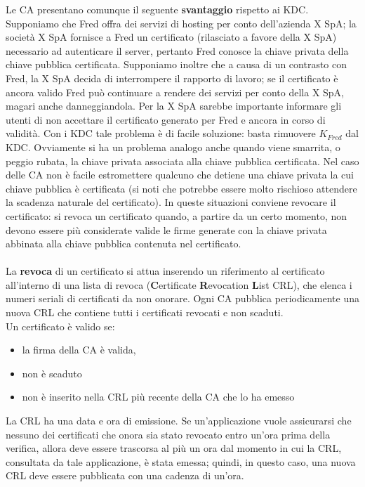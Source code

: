 Le CA presentano comunque il seguente \textbf{svantaggio} rispetto ai KDC. Supponiamo che Fred offra dei servizi di hosting per conto dell'azienda X SpA; la società X SpA fornisce a Fred un certificato (rilasciato a favore della X SpA) necessario ad autenticare il server, pertanto Fred conosce la chiave privata della chiave pubblica certificata. Supponiamo inoltre che a causa di un contrasto con Fred, la X SpA decida di interrompere il rapporto di lavoro; se il certificato è ancora valido Fred può continuare a rendere dei servizi per conto della X SpA, magari anche danneggiandola. Per la X SpA sarebbe importante informare gli utenti di non accettare il certificato generato per Fred e ancora in corso di validità. Con i KDC tale problema è di facile soluzione: basta rimuovere $K_{Fred}$ dal KDC. Ovviamente si ha un problema analogo anche quando viene smarrita, o peggio rubata, la chiave privata associata alla chiave pubblica certificata. Nel caso delle CA non è facile estromettere qualcuno che detiene una chiave privata la cui chiave pubblica è certificata (si noti che potrebbe essere molto rischioso attendere la scadenza naturale del certificato). In queste situazioni conviene revocare il certificato: si revoca un certificato quando, a partire da un certo momento, non devono essere più considerate valide le firme generate con la chiave privata abbinata alla chiave pubblica contenuta nel certificato. \\ \\
La \textbf{revoca} di un certificato si attua inserendo un riferimento al certificato all'interno di una lista di revoca (\textbf{C}ertificate \textbf{R}evocation \textbf{L}ist CRL), che elenca i numeri seriali di certificati da non onorare. Ogni CA pubblica periodicamente una nuova CRL che contiene tutti i certificati revocati e non scaduti.\\
Un certificato è valido se:
\begin{itemize}
	\item la firma della CA è valida,
	\item non è scaduto
	\item non è inserito nella CRL più recente della CA che lo ha emesso
\end{itemize}
La CRL ha una data e ora di emissione. Se un'applicazione vuole assicurarsi che nessuno dei certificati che onora sia stato revocato entro un'ora prima della verifica, allora deve essere trascorsa al più un ora dal momento in cui la CRL, consultata da tale applicazione, è stata emessa; quindi, in questo caso, una nuova CRL deve essere pubblicata con una cadenza di un'ora.\\
